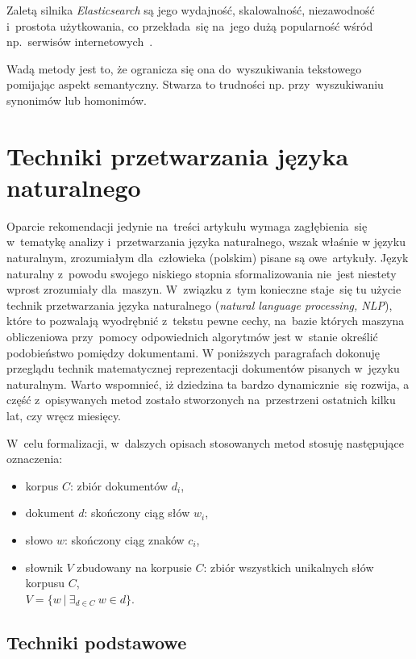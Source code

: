 \documentclass[pl]{minipw} %
\begin{document}
Zaletą silnika \textit{Elasticsearch} są jego wydajność, skalowalność, niezawodność i~prostota użytkowania, co przekłada~się na~jego dużą popularność wśród np.~serwisów internetowych~\cite{elastic_companies}.

Wadą metody jest to, że ogranicza się ona do~wyszukiwania tekstowego pomijając aspekt semantyczny. Stwarza to trudności np. przy~wyszukiwaniu synonimów lub homonimów.

\section{Techniki przetwarzania języka naturalnego}
Oparcie rekomendacji jedynie na~treści artykułu wymaga zagłębienia~się w~tematykę analizy i~przetwarzania języka naturalnego, wszak właśnie w języku naturalnym, zrozumiałym dla~człowieka (polskim) pisane są owe~artykuły. Język naturalny z~powodu swojego niskiego stopnia sformalizowania nie~jest niestety wprost zrozumiały dla~maszyn. W~związku z~tym konieczne staje~się tu użycie technik przetwarzania języka naturalnego (\textit{natural language processing, NLP}), które to pozwalają wyodrębnić z~tekstu pewne cechy, na~bazie których maszyna obliczeniowa przy~pomocy odpowiednich algorytmów jest w~stanie określić podobieństwo pomiędzy dokumentami. W poniższych paragrafach dokonuję przeglądu technik matematycznej reprezentacji dokumentów pisanych w~języku naturalnym. Warto wspomnieć, iż dziedzina ta bardzo dynamicznie~się rozwija, a część z~opisywanych metod zostało stworzonych na~przestrzeni ostatnich kilku lat, czy wręcz miesięcy.

W~celu formalizacji, w~dalszych opisach stosowanych metod stosuję następujące oznaczenia:
\begin{itemize}
	\item korpus $C$: zbiór dokumentów $d_i$,
	\item dokument $d$: skończony ciąg słów $w_i$,
	\item słowo $w$: skończony ciąg znaków $c_i$,
	\item słownik $V$ zbudowany na korpusie $C$: zbiór wszystkich unikalnych słów korpusu $C$,\\$V = \{w\ |\ \exists_{d \in C}\ w \in d\}$.
\end{itemize}

\subsection{Techniki podstawowe}
\end{document}
